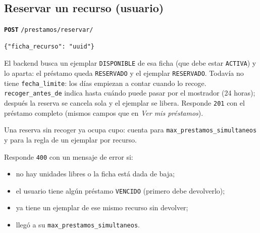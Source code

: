 \documentclass[11pt]{article}
\newcommand{\us}{\_\allowbreak}
\newcommand{\metodo}[2]{\textbf{\texttt{#1}} \texttt{#2}}
\begin{document}
\subsection*{Reservar un recurso (usuario)}
\metodo{POST}{/prestamos/reservar/}
\begin{lstlisting}
{"ficha_recurso": "uuid"}
\end{lstlisting}
El backend busca un ejemplar \texttt{DISPONIBLE} de esa ficha (que debe estar \texttt{ACTIVA}) y lo aparta: el pr\'estamo queda \texttt{RESERVADO} y el ejemplar \texttt{RESERVADO}. Todav\'ia no tiene \texttt{fecha\us limite}: los d\'ias empiezan a contar cuando lo recoge. \texttt{recoger\us antes\us de} indica hasta cu\'ando puede pasar por el mostrador (24 horas); despu\'es la reserva se cancela sola y el ejemplar se libera. Responde \texttt{201} con el pr\'estamo completo (mismos campos que en \textit{Ver mis pr\'estamos}).

Una reserva sin recoger ya ocupa cupo: cuenta para \texttt{max\us prestamos\us simultaneos} y para la regla de un ejemplar por recurso.

Responde \texttt{400} con un mensaje de error si:
\begin{itemize}
    \item no hay unidades libres o la ficha est\'a dada de baja;
    \item el usuario tiene alg\'un pr\'estamo \texttt{VENCIDO} (primero debe devolverlo);
    \item ya tiene un ejemplar de ese mismo recurso sin devolver;
    \item lleg\'o a su \texttt{max\us prestamos\us simultaneos}.
\end{itemize}
\end{document}
